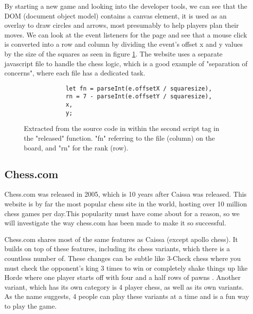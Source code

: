 By starting a new game and looking into the developer tools, we can see that the DOM (document object model) contains a canvas element, it is used as an overlay to draw circles and arrows, most presumably to help players plan their moves. We can look at the event listeners for the page and see that a mouse click is converted into a row and column by dividing the event's offset x and y values by the size of the squares as seen in figure \ref{CaissaMouseToSquare}. The website uses a separate javascript file to handle the chess logic, which is a good example of "separation of concerns", where each file has a dedicated task.

\begin{figure}[h]
    \begin{center}
        \begin{lstlisting}
            let fn = parseInt(e.offsetX / squaresize),
            rn = 7 - parseInt(e.offsetY / squaresize),
            x,
            y;
        \end{lstlisting}
        \caption{Extracted from the source code in \cite{CaissaCode} within the second script tag in the "released" function. "fn" referring to the file (column) on the board, and "rn" for the rank (row).}
        \label{CaissaMouseToSquare}
    \end{center}
\end{figure}

\subsection{Chess.com}


\cite{Chess.com} Chess.com was released in 2005, which is 10 years after Caissa was released. This website is by far the most popular chess site in the world, hosting over 10 million chess games per day.This popularity must have come about for a reason, so we will investigate the way chess.com has been made to make it so successful.

Chess.com shares most of the same features as Caissa (except apollo chess). It builds on top of these features, including its chess variants, which there is a countless number of. These changes can be subtle like 3-Check chess where you must check the opponent's king 3 times to win or completely shake things up like Horde where one player starts off with four and a half rows of pawns \cite{Chess.comVariants}. Another variant, which has its own category is 4 player chess, as well as its own variants. As the name suggests, 4 people can play these variants at a time and is a fun way to play the game.

